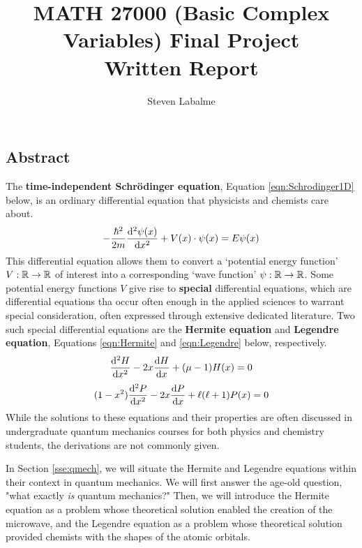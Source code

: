 \documentclass[titlepage]{article}
\title{
    MATH 27000 (Basic Complex Variables) Final Project\\
    Written Report
}
\author{Steven Labalme}
\numberwithin{equation}{section}
\begin{document}
\renewcommand{\thepage}{C}
\maketitle



\tableofcontents
\newpage



\pagestyle{main}
\renewcommand{\leftmark}{Abstract}
\begin{center}
    \section*{Abstract}
\end{center}
The \textbf{time-independent Schr\"{o}dinger equation}, Equation \ref{eqn:Schrodinger1D} below, is an ordinary differential equation that physicists and chemists care about.
\begin{equation}\label{eqn:Schrodinger1D}
    -\frac{\hbar^2}{2m}\dv[2]{\psi(x)}{x}+V(x)\cdot\psi(x) = E\psi(x)
\end{equation}
This differential equation allows them to convert a `potential energy function' $V:\mathbb{R}\to\mathbb{R}$ of interest into a corresponding `wave function' $\psi:\mathbb{R}\to\mathbb{R}$. Some potential energy functions $V$ give rise to \textbf{special} differential equations, which are differential equations tha occur often enough in the applied sciences to warrant special consideration, often expressed through extensive dedicated literature. Two such special differential equations are the \textbf{Hermite equation} and \textbf{Legendre equation}, Equations \ref{eqn:Hermite} and \ref{eqn:Legendre} below, respectively.
\begin{equation}\label{eqn:Hermite}
    \dv[2]{H}{x}-2x\dv{H}{x}+(\mu-1)H(x) = 0
\end{equation}
\begin{equation}\label{eqn:Legendre}
    (1-x^2)\dv[2]{P}{x}-2x\dv{P}{x}+\ell(\ell+1)P(x) = 0
\end{equation}
While the solutions to these equations and their properties are often discussed in undergraduate quantum mechanics courses for both physics and chemistry students, the derivations are not commonly given.\par
In Section \ref{sse:qmech}, we will situate the Hermite and Legendre equations within their context in quantum mechanics. We will first answer the age-old question, "what exactly \emph{is} quantum mechanics?" Then, we will introduce the Hermite equation as a problem whose theoretical solution enabled the creation of the microwave, and the Legendre equation as a problem whose theoretical solution provided chemists with the shapes of the atomic orbitals.\par
\end{document}
